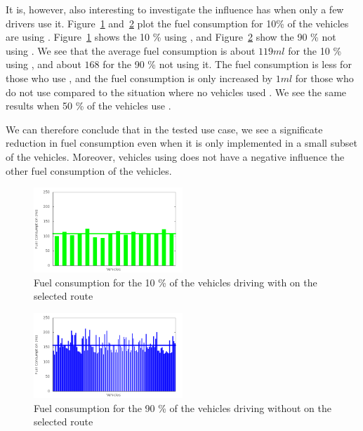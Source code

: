 It is, however, also interesting to investigate the influence \tech has when only a few drivers use it.
Figure~\ref{fig:TestResults:fuelControlled10} and~\ref{fig:TestResults:fuelUncontrolled10} plot the fuel consumption for 10\% of the vehicles are using \tech.
Figure~\ref{fig:TestResults:fuelControlled10} shows the 10 \% using \tech, and Figure~\ref{fig:TestResults:fuelUncontrolled10} show the 90 \% not using \tech.
We see that the average fuel consumption is about $119 ml$ for the 10 \% using \tech, and about $168$ for the 90 \% not using it.
The fuel consumption is less for those who use \tech, and the fuel consumption is only increased by $1 ml$ for those who do not use \tech compared to the situation where no vehicles used \tech.
We see the same results when 50 \% of the vehicles use \tech.

We can therefore conclude that in the tested use case, we see a significate reduction in fuel consumption even when it is only implemented in a small subset of the vehicles. 
Moreover, vehicles using \tech does not have a negative influence the other fuel consumption of the vehicles.

\begin{figure}[h]
\includegraphics[width=0.5\textwidth]{../images/tp0/fuelRouteControlled10.png}
\caption{Fuel consumption for the 10 \% of the vehicles driving with \tech on the selected route}
\label{fig:TestResults:fuelControlled10}
\end{figure}
\begin{figure}[h]
\includegraphics[width=0.5\textwidth]{../images/tp0/fuelRouteUncontrolled10.png}
\caption{Fuel consumption for the 90 \% of the vehicles driving without \tech on the selected route}
\label{fig:TestResults:fuelUncontrolled10}
\end{figure}

